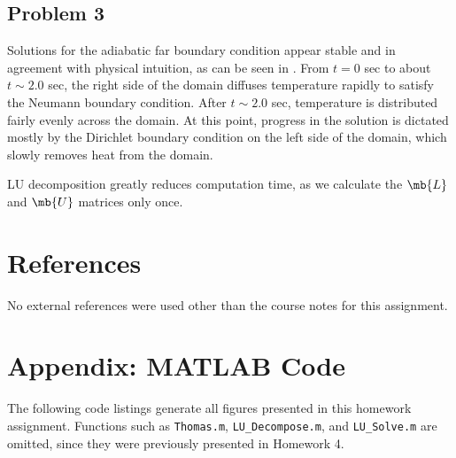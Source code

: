 \documentclass[11pt]{article}
\begin{document}
\subsection{Problem 3}

Solutions for the adiabatic far boundary condition appear stable and in agreement with physical intuition, as can be seen in . From $t=0$ sec to about $t \sim 2.0$ sec, the right side of the domain diffuses temperature rapidly to satisfy the Neumann boundary condition. After $t \sim 2.0$ sec, temperature is distributed fairly evenly across the domain. At this point, progress in the solution is dictated mostly by the Dirichlet boundary condition on the left side of the domain, which slowly removes heat from the domain.

LU decomposition greatly reduces computation time, as we calculate the $\mb{L}$ and $\mb{U}$ matrices only once.

\section{References} %

No external references were used other than the course notes for this assignment.

\section*{Appendix: MATLAB Code} %

The following code listings generate all figures presented in this homework assignment. Functions such as \lstinline|Thomas.m|, \lstinline|LU_Decompose.m|, and \lstinline|LU_Solve.m| are omitted, since they were previously presented in Homework 4.


\end{document}
